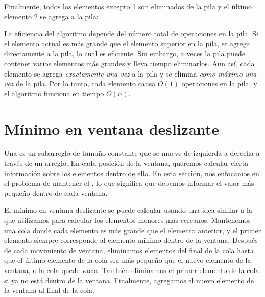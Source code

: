 Finalmente, todos los elementos excepto 1 son eliminados
de la pila y el último elemento 2
se agrega a la pila:

\begin{center}
\end{center}

La eficiencia del algoritmo depende del
número total de operaciones en la pila.
Si el elemento actual es más grande que
el elemento superior en la pila, se agrega directamente
a la pila, lo cual es eficiente.
Sin embargo, a veces la pila puede contener varios
elementos más grandes y lleva tiempo eliminarlos.
Aun así, cada elemento se agrega \emph{exactamente una vez} a la pila
y se elimina \emph{como máximo una vez} de la pila.
Por lo tanto, cada elemento causa $O(1)$ operaciones en la pila,
y el algoritmo funciona en tiempo $O(n)$.

\section{Mínimo en ventana deslizante}


Una  es un subarreglo de tamaño constante
que se mueve de izquierda a derecha a través de un arreglo.
En cada posición de la ventana,
queremos calcular cierta información
sobre los elementos dentro de ella.
En esta sección, nos enfocamos en el problema
de mantener el ,
lo que significa que debemos informar el valor más
pequeño dentro de cada ventana.

El mínimo en ventana deslizante se puede calcular
usando una idea similar a la que utilizamos para calcular
los elementos menores más cercanos.
Mantenemos una cola
donde cada elemento es más grande que
el elemento anterior,
y el primer elemento
siempre corresponde al elemento mínimo dentro de la ventana.
Después de cada movimiento de ventana,
eliminamos elementos del final de la cola
hasta que el último elemento de la cola
sea más pequeño que el nuevo elemento de la ventana,
o la cola quede vacía.
También eliminamos el primer elemento de la cola
si ya no está dentro de la ventana.
Finalmente, agregamos el nuevo elemento de la ventana
al final de la cola.

